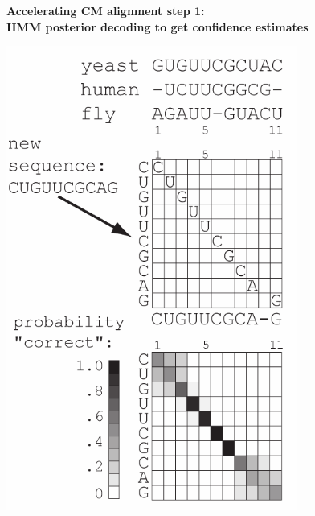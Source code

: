 \documentclass[landscape]{slides}
\begin{document}
\begin{slide}
\begin{slide}
\vfill
\end{slide}
%
%
%
\begin{slide}
\begin{center}

\textbf{Accelerating CM alignment step 1: \\ HMM posterior decoding to
  get confidence estimates}

\includegraphics[height=6in]{figs/hmm_alignment2_layer3}
\end{center}


\end{slide}
\end{slide}
\end{document}
